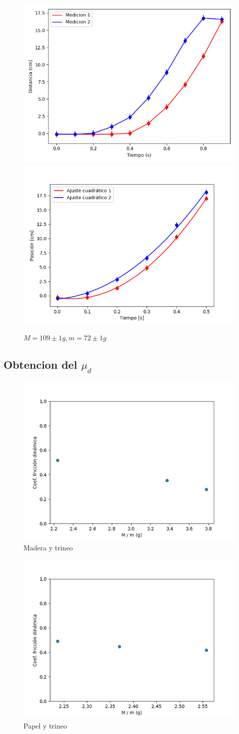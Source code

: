 \documentclass[12pt,a4]{article}
\begin{document}
\begin{figure}[H] %
    \centering
    \includegraphics[width=0.4\linewidth]{TiempoVsDistanciaPapelPapelV_O.png}
    \includegraphics[width=0.44\linewidth]{ajuste2_PapelPapelV_O.png}
    \caption{$M = 109 \pm 1 g, m = 72 \pm 1 g$}
    \label{fig:TvDV_O papel papel}
\end{figure}

\subsection{Obtencion del $\mu_d$}

\begin{figure}[H]
    \centering
    \includegraphics[width=0.6\linewidth]{ud_PisoMadera.png}
    \caption{Madera y trineo}
    \label{fig:mu_d piso trineo}
\end{figure}

\begin{figure}[H]
    \centering
    \includegraphics[width=0.6\linewidth]{ud_PisoPapel.png}
    \caption{Papel y trineo}
    \label{fig:mu_d piso hoja}
\end{figure}
\end{document}
